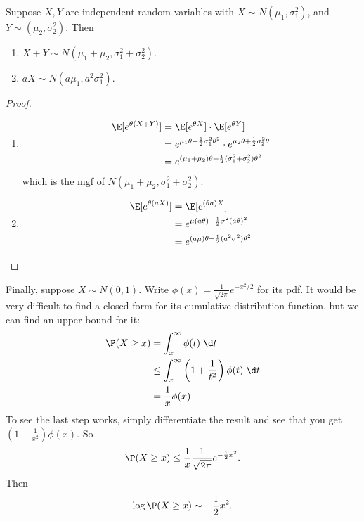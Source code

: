 \documentclass[a4paper]{article}
\begin{document}
\begin{thm}
  Suppose $X, Y$ are independent random variables with $X\sim N(\mu_1, \sigma_1^2)$, and $Y\sim (\mu_2, \sigma_2^2)$. Then
  \begin{enumerate}
    \item $X + Y \sim N(\mu_1 + \mu_2 , \sigma_1^2 + \sigma_2^2)$.
    \item $aX \sim N(a\mu_1, a^2 \sigma_1^2)$.
  \end{enumerate}
\end{thm}

\begin{proof}\leavevmode
  \begin{enumerate}
    \item
      \begin{align*}
        \E[e^{\theta(X + Y)}] &= \E[e^{\theta X}] \cdot \E[e^{\theta Y}]\\
        &= e^{\mu_1 \theta + \frac{1}{2}\sigma_1^2\theta^2} \cdot e^{\mu_2 \theta + \frac{1}{2}\sigma_2^2 \theta}\\
        &= e^{(\mu_1 + \mu_2)\theta + \frac{1}{2}(\sigma_1^2 + \sigma_2^2)\theta^2}
      \end{align*}
      which is the mgf of $N(\mu_1 + \mu_2, \sigma_1^2 + \sigma_2^2)$.
    \item
      \begin{align*}
        \E[e^{\theta (aX)}] &= \E[e^{(\theta a)X}]\\
        &= e^{\mu(a\theta) + \frac{1}{2}\sigma^2 (a \theta)^2}\\
        &= e^{(a\mu)\theta + \frac{1}{2}(a^2\sigma^2)\theta^2}\qedhere
      \end{align*}%
  \end{enumerate}
\end{proof}

Finally, suppose $X\sim N(0, 1)$. Write $\phi(x) = \frac{1}{\sqrt{2\pi}} e^{-x^2/2}$ for its pdf. It would be very difficult to find a closed form for its cumulative distribution function, but we can find an upper bound for it:
\begin{align*}
  \P(X \geq x) &= \int_x^\infty \phi(t)\;\d t\\
  &\leq \int_x^\infty \left(1 + \frac{1}{t^2}\right)\phi(t)\;\d t \\
  &= \frac{1}{x}\phi(x)
\end{align*}
To see the last step works, simply differentiate the result and see that you get $\left(1 + \frac{1}{x^2}\right)\phi(x)$.
So
\[
  \P(X \geq x) \leq \frac{1}{x}\frac{1}{\sqrt{2\pi}}e^{-\frac{1}{2}x^2}.
\]
Then
\[
  \log \P(X \geq x)\sim -\frac{1}{2}x^2.
\]
\end{document}
